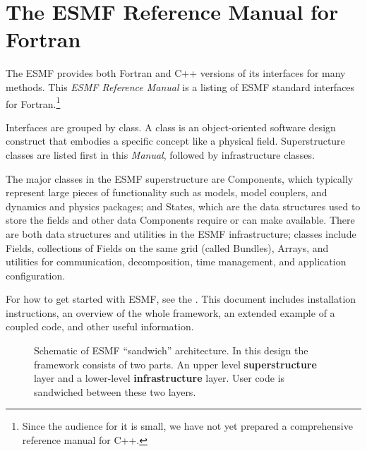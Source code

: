 \section{The ESMF Reference Manual for Fortran}

The ESMF provides both Fortran and C++ versions of its interfaces
for many methods.  This {\it ESMF Reference Manual} is a listing of 
ESMF standard interfaces for Fortran.\footnote{Since the audience for it is 
small, we have not yet prepared a comprehensive reference manual for C++.}  

Interfaces are grouped by class.  A class is an object-oriented software 
design construct that embodies 
a specific concept like a physical field.  Superstructure classes 
are listed first in this {\it Manual}, followed by infrastructure 
classes.

The major classes in the ESMF superstructure are Components, which 
typically represent
large pieces of functionality such as models, model couplers, and 
dynamics and physics packages; and States, which are the data structures
used to store the fields and other data Components require or can 
make available.  There are both data structures and utilities in the ESMF 
infrastructure; classes include Fields, collections of Fields on the 
same grid (called Bundles), Arrays, and utilities for communication,
decomposition, time management, and application configuration.

For how to get started with ESMF, see the 
.  This document includes installation instructions, an
overview of the whole framework, an extended example of a coupled code, 
and other useful information. 

\begin{center}
\begin{figure}
\caption{Schematic of ESMF ``sandwich'' architecture. In this design the framework consists of two parts. An upper level
{\bf superstructure} layer and a lower-level {\bf infrastructure} layer. User code is sandwiched between these two layers.}
\label{fig:TheESMFwich}
\end{figure}
\end{center}













